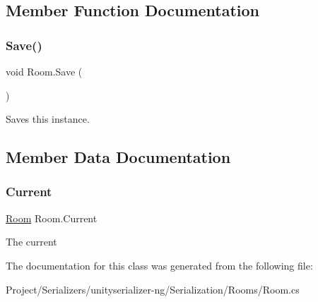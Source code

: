 \subsection{Member Function Documentation}
\mbox{\label{class_room_a4f68e1dc04721a708c3663cc7e9020c3}} 
\subsubsection{\texorpdfstring{Save()}{Save()}}
{\footnotesize\ttfamily void Room.\+Save (\begin{DoxyParamCaption}{ }\end{DoxyParamCaption})\hspace{0.3cm}{\ttfamily [inline]}}



Saves this instance. 



\subsection{Member Data Documentation}
\mbox{\label{class_room_a68d55b64ae2e018accd029731c2ca354}} 
\subsubsection{\texorpdfstring{Current}{Current}}
{\footnotesize\ttfamily \hyperlink{class_room}{Room} Room.\+Current\hspace{0.3cm}{\ttfamily [static]}}



The current 



The documentation for this class was generated from the following file\+:\begin{DoxyCompactItemize}
\item 
Project/\+Serializers/unityserializer-\/ng/\+Serialization/\+Rooms/Room.\+cs\end{DoxyCompactItemize}
